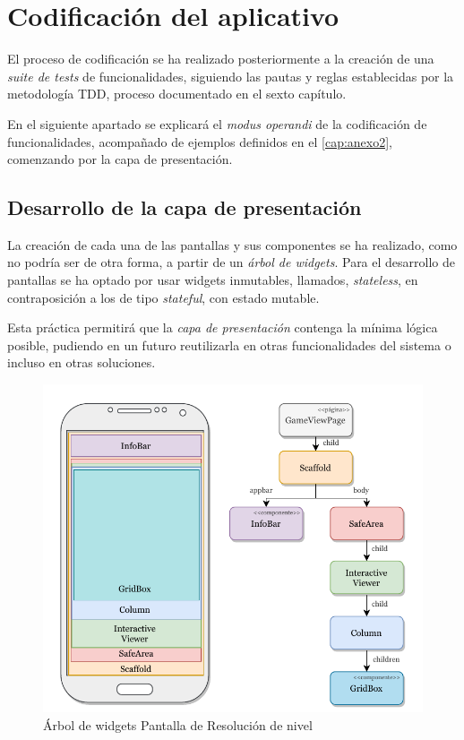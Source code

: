 \section{Codificación del aplicativo}
El proceso de codificación se ha realizado posteriormente a la creación de una \textit{suite de tests} de funcionalidades, siguiendo las pautas y
reglas establecidas por la metodología TDD, proceso documentado en el sexto capítulo.

En el siguiente apartado se explicará el \textit{modus operandi} de la codificación de funcionalidades, acompañado de ejemplos definidos 
en el \autoref{cap:anexo2}, comenzando por la capa de presentación.

\subsection{Desarrollo de la capa de presentación}
La creación de cada una de las pantallas y sus componentes se ha realizado, como no podría ser de otra forma, a partir de un \textit{árbol de widgets}. 
Para el desarrollo de pantallas se ha optado por usar widgets inmutables, llamados, \textit{stateless}, en contraposición a los de tipo \textit{stateful},
con estado mutable. \cite{10.1007/978-981-15-1465-4_56} 

Esta práctica permitirá que la \textit{capa de presentación} contenga la mínima lógica posible, pudiendo en un futuro reutilizarla
en otras funcionalidades del sistema o incluso en otras soluciones.

\begin{figure}[H]
  \centering
  \includegraphics[scale=0.83]{images/treewidgets.pdf}
  \caption{Árbol de widgets Pantalla de Resolución de nivel}
  \label{fig:tree-widgets-1}
\end{figure}

